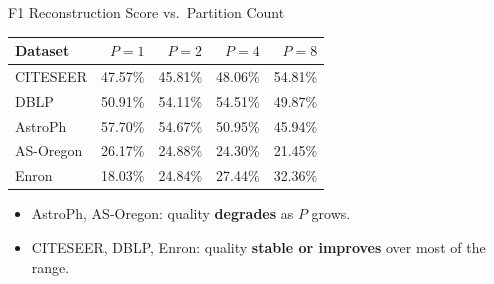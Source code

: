 \documentclass[aspectratio=169]{beamer}
\begin{document}
\begin{frame}{F1 Reconstruction Score vs.\ Partition Count}
  \small
  \begin{tabular}{lrrrr}
    \toprule
    Dataset & $P=1$ & $P=2$ & $P=4$ & $P=8$ \\
    \midrule
    CITESEER   & 47.57\% & 45.81\% & 48.06\% & 54.81\% \\
    DBLP       & 50.91\% & 54.11\% & 54.51\% & 49.87\% \\
    AstroPh    & 57.70\% & 54.67\% & 50.95\% & 45.94\% \\
    AS-Oregon  & 26.17\% & 24.88\% & 24.30\% & 21.45\% \\
    Enron      & 18.03\% & 24.84\% & 27.44\% & 32.36\% \\
    \bottomrule
  \end{tabular}
  \vspace{1em}
  \begin{itemize}
    \item AstroPh, AS-Oregon: quality \textbf{degrades} as $P$ grows.
    \item CITESEER, DBLP, Enron: quality \textbf{stable or improves} over most of the range.
  \end{itemize}
\end{frame}
\end{document}
